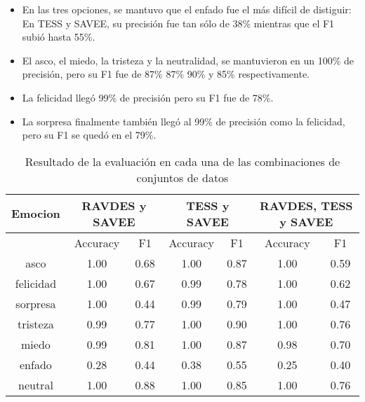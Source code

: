 \documentclass[11pt,a4paper,spanish]{book}
\begin{document}
	\begin{itemize}
		\item En las tres opciones, se mantuvo que el enfado fue el más difícil de distiguir: En TESS y SAVEE, su precisión fue tan sólo de 38\% mientras que el F1 subió hasta 55\%.
		
		\item El asco, el miedo, la tristeza y la neutralidad, se mantuvieron en un 100\% de precisión, pero su F1 fue de 87\% 87\% 90\% y 85\% respectivamente.
		
		\item La felicidad llegó 99\% de precisión pero su F1 fue de 78\%.
		
		\item La sorpresa finalmente también llegó al 99\% de precisión como la felicidad, pero su F1 se quedó en el 79\%.
	\end{itemize}

	
	\begin{table}[H]
		\centering
		\begin{center}
			\begin{tabular}{| c|| c c |  c c |  c c | }
				\hline
					\multicolumn{1}{|c||}{Emocion} & 
					\multicolumn{2}{|c|}{RAVDES y SAVEE}&
					\multicolumn{2}{|c|}{TESS y SAVEE} &
					\multicolumn{2}{|c|}{RAVDES, TESS y SAVEE} \\
				\hline
				 	& 
					 \multicolumn{1}{|c|}{Accuracy}&\multicolumn{1}{|c|}{F1}&
					 \multicolumn{1}{|c|}{Accuracy}&\multicolumn{1}{|c|}{F1}&
					 \multicolumn{1}{|c|}{Accuracy}&\multicolumn{1}{|c|}{F1}\\
				\hline

				asco 		& 1.00 & 0.68 & 1.00 & 0.87 & 1.00 & 0.59\\
				felicidad 	& 1.00 & 0.67 & 0.99 & 0.78 & 1.00 & 0.62\\
				sorpresa 	& 1.00 & 0.44 & 0.99 & 0.79 & 1.00 & 0.47\\
				tristeza 	& 0.99 & 0.77 & 1.00 & 0.90 & 1.00 & 0.76\\
				miedo 		& 0.99 & 0.81 & 1.00 & 0.87 & 0.98 & 0.70\\
				enfado 		& 0.28 & 0.44 & 0.38 & 0.55 & 0.25 & 0.40\\
				neutral 	& 1.00 & 0.88 & 1.00 & 0.85 & 1.00 & 0.76\\
				\hline
			\end{tabular}
			
			\caption{Resultado de la evaluación en cada una de las combinaciones de conjuntos de datos}
			\label{result_Test3}
		\end{center}
	\end{table}
	
\end{document}
